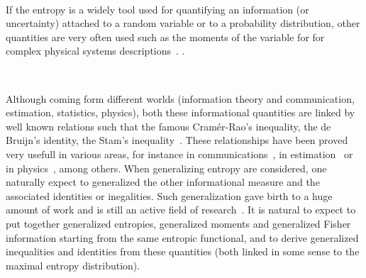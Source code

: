 \documentclass[english,sort&compress]{elsarticle}
\theoremstyle{definition}
\theoremstyle{plain}
\theoremstyle{plain}
\begin{document}
\

If  the  entropy is  a  widely  tool used  for  quantifying  an information  (or
uncertainty) attached  to a  random variable or  to a  probability distribution,
other  quantities are  very  often used  such  as the  moments  of the  variable
 for  for  complex  physical
systems   descriptions~\cite{Fri04,  VigBer03,  RomAng99,   RomSan06,  SanGon06,
  TorLop15}.  .

\

Although  coming form  different worlds  (information theory  and communication,
estimation, statistics, physics), both these informational quantities are linked
by well known  relations such that the famous  Cram\'er-Rao's inequality, the de
Bruijn's  identity,  the   Stam's  inequality~\cite{CovTho06,  Sta59,  DemCov91,
  GuoSha05}.   These relationships  have  been proved  very  usefull in  various
areas,  for  instance  in  communications~\cite{Sta59, DemCov91,  CovTho06},  in
estimation~\cite{Kay93} or in physics~\cite{FolSit97, Sen11}, among others. When
generalizing  entropy are considered,  one naturally  expect to  generalized the
other informational measure and  the associated identities or inegalities.  Such
generalization gave birth to a huge amount  of work and is still an active field
of research~\cite{Vaj73,  Boe77, Ham78, BoeVan80,  BurRao82, LutYan04, LutYan05,
  LutYan07, LutLv12, JohVig07, Ber12:06_1,  Ber12:06_2, Ber13, Ber13:08}.  It is
natural to expect to put together generalized entropies, generalized moments and
generalized Fisher  information starting from the same  entropic functional, and
to derive  generalized inequalities and  identities from these  quantities (both
linked in some sense to the maximal entropy distribution).

\
\end{document}
